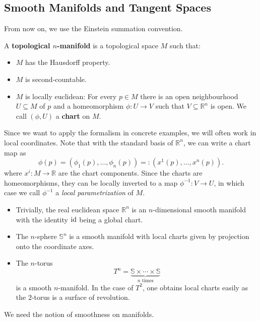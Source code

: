 \subsection*{Smooth Manifolds and Tangent Spaces}
From now on, we use the Einstein summation convention.
\begin{definition}
    A \textbf{topological $n$-manifold} is a topological space $M$ such that:
    \begin{itemize}
        \item $M$ has the Hausdorff property.
        \item $M$ is second-countable.
        \item $M$ is locally euclidean: For every $p \in M$ there is an open neighbourhood $U \subseteq M$ of $p$ and a homeomorphism $\phi: U \to V$ such that $V \subseteq \mathbb{R}^n$ is open. We call $(\phi, U)$ a \textbf{chart} on $M$.
    \end{itemize}
\end{definition}
Since we want to apply the formalism in concrete examples, we will often work in local coordinates. Note that with the standard basis of $\mathbb{R}^n$, we can write a chart map as 
\[
\phi(p)=(\phi_1(p), \dots, \phi_n(p)) =: (x^1(p), \dots, x^n(p))
.\] where $x^i: M \to \mathbb{R}$ are the chart components. Since the charts are homeomorphisms, they can be locally inverted to a map $\phi^{-1}: V \to U$, in which case we call $\phi^{-1}$ a \emph{local parametrization} of $M$.
\begin{eg}
    \begin{itemize}
        \item Trivially, the real euclidean space $\mathbb{R}^n$ is an $n$-dimensional smooth manifold with the identity $\operatorname{id}$ being a global chart.
        \item The $n$-sphere $\mathbb{S}^n$ is a smooth manifold with local charts given by projection onto the coordinate axes.
    \item The $n$-torus \[T^n = \underbrace{\mathbb{S} \times \cdots \times \mathbb{S}}_{n\text{ times}}\] is a smooth $n$-manifold. In the case of $T^2$, one obtains local charts easily as the $2$-torus is a surface of revolution. 
    \end{itemize}
\end{eg}
We need the notion of smoothness on manifolds.
